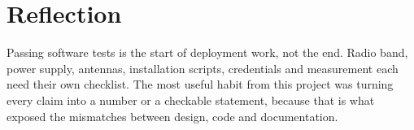 \documentclass{tietreport}
\begin{document}
\section{Reflection}

Passing software tests is the start of deployment work, not the end.
Radio band, power supply, antennas, installation scripts, credentials
and measurement each need their own checklist. The most useful habit
from this project was turning every claim into a number or a
checkable statement, because that is what exposed the mismatches
between design, code and documentation.

\printbibliography[heading=bibintoc]
\end{document}
